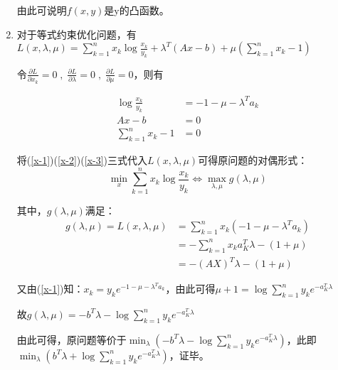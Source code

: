 \documentclass[]{article}
\begin{document}
\begin{enumerate}
    由此可说明$f(x,y)$是y的凸函数。
    
    \item
    
    对于等式约束优化问题，有$L(x, \lambda,\mu)=\sum_{k=1}^n x_k \log\frac{x_k}{y_k}+\lambda^T(Ax-b)+\mu(\sum_{k=1}^n x_k-1)$
    
    令$\frac{\partial L}{\partial x_k}=0\;,\;\frac{\partial L}{\partial \lambda}=0\;,\;\frac{\partial L}{\partial \mu}=0$，则有
    
    \begin{align}
        \log\frac{x_k}{y_k} &=-1-\mu-\lambda^T a_k \label{x-1}\\
        Ax-b &=0 \label{x-2}\\
        \sum_{k=1}^n x_k-1 &=0 \label{x-3}
    \end{align}

    将(\ref{x-1})(\ref{x-2})(\ref{x-3})三式代入$L(x,\lambda,\mu)$可得原问题的对偶形式：
$$
\min_x \sum_{k=1}^n x_k\log\frac{x_k}{y_k} \iff \max_{\lambda, \mu}g(\lambda, \mu)
$$

其中，$g(\lambda,\mu)$满足：
\begin{align*}
g(\lambda,\mu)=L(x,\lambda,\mu) &=\sum_{k=1}^n x_k (-1-\mu-\lambda^T a_k)\\
&=-\sum_{k=1}^n x_k a_K^T \lambda-(1+\mu)\\
&=-(AX)^T\lambda-(1+\mu)
\end{align*}

又由(\ref{x-1})知：$x_k=y_k e^{-1-\mu-\lambda^T a_k}$，由此可得$\mu+1=\log\sum_{k=1}^n y_k e^{-a_K^T\lambda}$

故$g(\lambda,\mu)=-b^T\lambda -\log\sum_{k=1}^n y_k e^{-a_K^T\lambda}$

由此可得，原问题等价于$\min_{\lambda}(-b^T\lambda -\log\sum_{k=1}^n y_k e^{-a_K^T\lambda})$，此即$\min_{\lambda}(b^T\lambda +\log\sum_{k=1}^n y_k e^{-a_K^T\lambda})$，证毕。

    
\end{enumerate}
\end{document}

